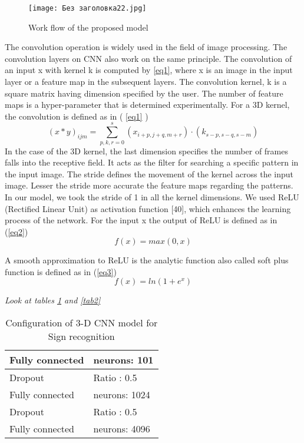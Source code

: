 \documentclass[
  manuscript=article,  %
  layout=preprint,  %
  year=20xx,
  volume=x,
]{joas}
\begin{document}
\begin{figure}[h!]
    \centering
    \texttt{[image: Без заголовка22.jpg]}
    \caption{Work flow of the proposed model}
    \label{f2}
\end{figure}



The convolution operation is widely used in the field of image processing. The convolution layers on CNN also work on the same principle. The convolution of an input x with kernel k is computed by \ref{eq1}, where x is an image in the input layer or a feature map in the subsequent layers. The convolution kernel, k is a square matrix having dimension specified by the user. The number of feature maps is a hyper-parameter that is determined experimentally. For a 3D kernel, the convolution is defined as in ( \ref{eq1} )
\begin{equation}
(x*y)_{ijm}=\sum^s_{p,k,r=0} (x_{i+p,j+q,m+r})\cdot (k_{s-p, s-q, s-m}) \label{eq1}
\end{equation}
In the case of the 3D kernel, the last dimension specifies the number of frames falls into the receptive field. It acts as the filter for searching a specific pattern in the input image. The stride defines the movement of the kernel across the input image. Lesser the stride more accurate the feature maps regarding the patterns. In our model, we took the stride of 1 in all the kernel dimensions. We used ReLU (Rectified Linear Unit) as activation function [40], which enhances the learning process of the network. For the input x the output of ReLU is defined as in (\ref{eq2})
\begin{equation}
f(x)=max(0,x) \label{eq2}
\end{equation}

A smooth approximation to ReLU is the analytic function also called soft plus function is defined as in (\ref{eq3})
\begin{equation}
f (x) = ln(1 + e^x) \label{eq3}
\end{equation}






\par {\Huge \emph {Look at tables \ref{tab1} and \ref{tab2}}}


\begin{table}[!ht]
\centering
\caption{ Configuration of 3-D CNN model for Sign recognition\label{tab1}}
\begin{tabular*}{\columnwidth}{@{\extracolsep\fill}|l|l|@{\extracolsep\fill}} 


\toprule 
Fully connected & neurons: 101\\
\midrule
Dropout & Ratio : 0.5 \\
Fully connected & neurons: 1024 \\
Dropout & Ratio : 0.5 \\
Fully connected & neurons: 4096\\
\bottomrule
\end{tabular*}
\end{table}
\end{document}
